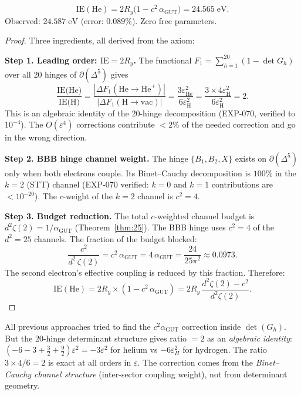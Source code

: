 \begin{theorem}
\label{thm:helium_IE}
\begin{equation}
\boxed{\text{IE}(\text{He}) = 2R_y\bigl(1 - c^2\,\alpha_\text{GUT}\bigr) = 24.565\;\text{eV}.}
\end{equation}
Observed: $24.587\;\text{eV}$ (error: $0.089\%$).  Zero free parameters.
\end{theorem}
\begin{proof}
Three ingredients, all derived from the axiom:

\textbf{Step 1.  Leading order: $\mathrm{IE} = 2R_y$.}
The functional $F_1 = \sum_{h=1}^{20}(1-\det G_h)$ over all 20 hinges of $\partial(\Delta^5)$ gives
\begin{equation}
\frac{\text{IE(He)}}{\text{IE(H)}} = \frac{|\Delta F_1(\text{He}\to\text{He}^+)|}{|\Delta F_1(\text{H}\to\text{vac})|}
= \frac{3\varepsilon_\text{He}^2}{6\varepsilon_\text{H}^2} = \frac{3 \times 4\varepsilon_\text{H}^2}{6\varepsilon_\text{H}^2} = 2.
\end{equation}
This is an algebraic identity of the 20-hinge decomposition (EXP-070, verified to $10^{-4}$).  The $O(\varepsilon^4)$ corrections contribute $<2\%$ of the needed correction and go in the wrong direction.

\textbf{Step 2.  BBB hinge channel weight.}
The hinge $\{B_1, B_2, X\}$ exists on $\partial(\Delta^5)$ only when both electrons couple.  Its Binet--Cauchy decomposition is $100\%$ in the $k=2$ (STT) channel (EXP-070 verified: $k=0$ and $k=1$ contributions are $< 10^{-20}$).  The $c$-weight of the $k=2$ channel is $c^2 = 4$.

\textbf{Step 3.  Budget reduction.}
The total $c$-weighted channel budget is $d^2\zeta(2) = 1/\alpha_\text{GUT}$ (Theorem~\ref{thm:25}).
The BBB hinge uses $c^2 = 4$ of the $d^2 = 25$ channels.  The fraction of the budget blocked:
\begin{equation}
\frac{c^2}{d^2\,\zeta(2)} = c^2\,\alpha_\text{GUT} = 4\,\alpha_\text{GUT} = \frac{24}{25\pi^2} \approx 0.0973.
\end{equation}
The second electron's effective coupling is reduced by this fraction.  Therefore:
\begin{equation}
\text{IE}(\text{He}) = 2R_y \times \left(1 - c^2\,\alpha_\text{GUT}\right) = 2R_y\,\frac{d^2\zeta(2) - c^2}{d^2\zeta(2)}.
\end{equation}
\end{proof}

\begin{remark}
All previous approaches tried to find the $c^2\alpha_\text{GUT}$ correction inside $\det(G_h)$.  But the 20-hinge determinant structure gives ratio $= 2$ as an \emph{algebraic identity}: $(-6 - 3 + \tfrac{3}{2} + \tfrac{9}{2})\varepsilon^2 = -3\varepsilon^2$ for helium vs $-6\varepsilon_H^2$ for hydrogen.  The ratio $3 \times 4 / 6 = 2$ is exact at all orders in $\varepsilon$.  The correction comes from the \emph{Binet--Cauchy channel structure} (inter-sector coupling weight), not from determinant geometry.
\end{remark}

